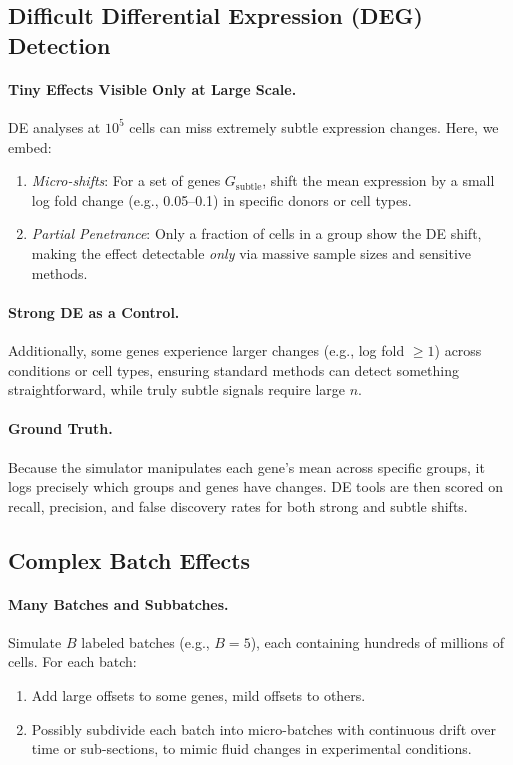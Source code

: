 \documentclass{article}
\begin{document}
\subsection{Difficult Differential Expression (DEG) Detection}
\label{sec:1B_deg}

\paragraph{Tiny Effects Visible Only at Large Scale.}
DE analyses at $10^5$ cells can miss extremely subtle expression changes. Here, we embed:
\begin{enumerate}
	\item \emph{Micro-shifts}: For a set of genes $G_{\text{subtle}}$, shift the mean expression by a small log fold change (e.g., 0.05--0.1) in specific donors or cell types. 
	\item \emph{Partial Penetrance}: Only a fraction of cells in a group show the DE shift, making the effect detectable \emph{only} via massive sample sizes and sensitive methods.
\end{enumerate}

\paragraph{Strong DE as a Control.}
Additionally, some genes experience larger changes (e.g., log fold $\geq 1$) across conditions or cell types, ensuring standard methods can detect something straightforward, while truly subtle signals require large $n$.

\paragraph{Ground Truth.}
Because the simulator manipulates each gene’s mean across specific groups, it logs precisely which groups and genes have changes. DE tools are then scored on recall, precision, and false discovery rates for both strong and subtle shifts.

\subsection{Complex Batch Effects}
\label{sec:1B_batch}

\paragraph{Many Batches and Subbatches.}
Simulate $B$ labeled batches (e.g., $B=5$), each containing hundreds of millions of cells. For each batch:
\begin{enumerate}
	\item Add large offsets to some genes, mild offsets to others.
	\item Possibly subdivide each batch into micro-batches with continuous drift over time or sub-sections, to mimic fluid changes in experimental conditions.
\end{enumerate}
\end{document}
